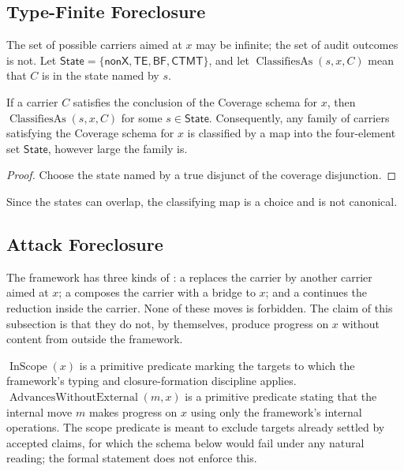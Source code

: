 \subsection{Type-Finite Foreclosure}\label{sec:foreclosure:type-finite}

The set of possible carriers aimed at \(x\) may be infinite; the set of
audit outcomes is not.  Let
\(\mathsf{State}=\{\mathsf{nonX},\mathsf{TE},\mathsf{BF},\mathsf{CTMT}\}\),
and let \(\operatorname{ClassifiesAs}(s,x,C)\) mean that \(C\) is in the
state named by \(s\).

\begin{theorem}\label{thm:type-finite-foreclosure}
If a carrier \(C\) satisfies the conclusion of
the Coverage schema for \(x\), then
\(\operatorname{ClassifiesAs}(s,x,C)\) for some \(s\in\mathsf{State}\).
Consequently, any family of carriers satisfying the Coverage schema for
\(x\) is classified by a map into the four-element set
\(\mathsf{State}\), however large the family is.
\end{theorem}

\begin{proof}
Choose the state named by a true disjunct of the coverage disjunction.
\end{proof}

Since the states can overlap, the classifying map is a choice and is
not canonical.

\subsection{Attack Foreclosure}\label{sec:foreclosure:attack-foreclosure-v4}

The framework has three kinds of \emph{\fim}: a \emph{\carrierPivot}
replaces the carrier by another carrier aimed at \(x\); a
\emph{\bridgeImport} composes the carrier with a bridge to \(x\); and a
\emph{\cascadeInternal} continues the reduction inside the carrier.
None of these moves is forbidden.  The claim of this subsection is that
they do not, by themselves, produce progress on \(x\) without content
from outside the framework.

\begin{definition}\label{def:in-scope}
\(\operatorname{InScope}(x)\) is a primitive predicate marking the
targets to which the framework's typing and closure-formation discipline
applies.  \(\operatorname{AdvancesWithoutExternal}(m,x)\) is a
primitive predicate stating that the internal move \(m\) makes progress
on \(x\) using only the framework's internal operations.  The scope
predicate is meant to exclude targets already settled by accepted
claims, for which the schema below would fail under any natural
reading; the formal statement does not enforce this.
\end{definition}

